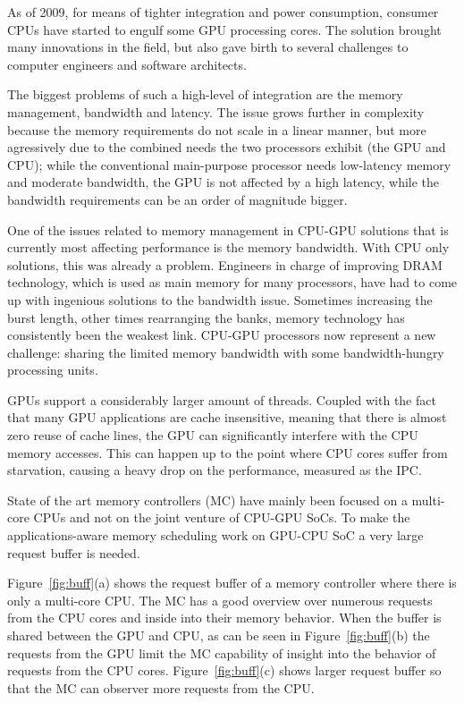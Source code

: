 \documentclass[journal]{IEEEtran}
\begin{document}
As of 2009, for means of tighter integration and power consumption, consumer CPUs have started to engulf some GPU processing cores. The solution brought many innovations in the field, but also gave birth to several challenges to computer engineers and software architects. 

The biggest problems of such a high-level of integration are the memory management, bandwidth and latency. The issue grows further in complexity because the memory requirements do not scale in a linear manner, but more agressively due to the combined needs the two processors exhibit (the GPU and CPU); while the conventional main-purpose processor needs low-latency memory and moderate bandwidth, the GPU is not affected by a high latency, while the bandwidth requirements can be an order of magnitude bigger.

One of the issues related to memory management in CPU-GPU solutions that is currently most affecting performance is the memory bandwidth. With CPU only solutions, this was already a problem. Engineers in charge of improving DRAM technology, which is used as main memory for many processors, have had to come up with ingenious solutions to the bandwidth issue. Sometimes increasing the burst length, other times rearranging the banks, memory technology has consistently been the weakest link. CPU-GPU processors now represent a new challenge: sharing the limited memory bandwidth with some bandwidth-hungry processing units.

GPUs support a considerably larger amount of threads. Coupled with the fact that many GPU applications are cache insensitive, meaning that there is almost zero reuse of cache lines, the GPU can significantly interfere with the CPU memory accesses. This can happen up to the point where CPU cores suffer from starvation, causing a heavy drop on the performance, measured as the IPC.

State of the art memory controllers (MC) have mainly been focused on a multi-core CPUs and not on the joint venture of CPU-GPU SoCs.  To make the applications-aware memory scheduling work on GPU-CPU SoC a very large request buffer is needed.

Figure~\ref{fig:buff}(a) shows the request buffer of a memory controller where there is only a multi-core CPU.  The MC has a good overview over numerous requests from the CPU cores and inside into their memory behavior.  When the buffer is shared between the GPU and CPU, as can be seen in Figure~\ref{fig:buff}(b) the requests from the GPU limit the MC capability of insight into the behavior of requests from the CPU cores.  Figure~\ref{fig:buff}(c) shows larger request buffer so that the MC can observer more requests from the CPU\cite{SmS}.
\end{document}
